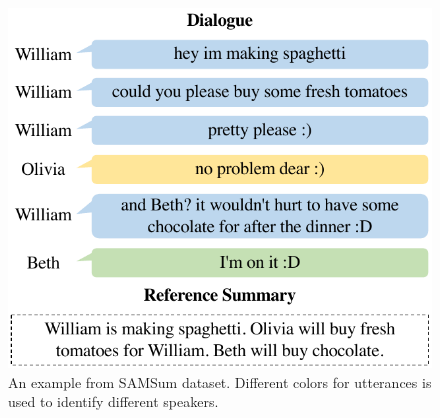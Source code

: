  \begin{figure}
	\centering
	\includegraphics[scale=0.63]{example.pdf}
	\caption{An example from SAMSum dataset. Different colors for utterances is used to identify different speakers.}
	\label{fig:example}
\end{figure}
%	
	
